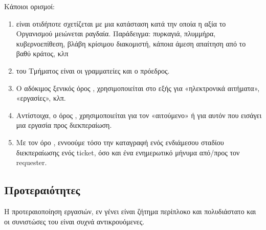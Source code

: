 \documentclass[letterpaper,10pt,greek]{sphinxhowto}
\begin{document}
\sphinxAtStartPar
Κάποιοι ορισμοί:
\begin{enumerate}
%
\item {} 
\sphinxAtStartPar
{} είναι οτιδήποτε σχετίζεται με μια κατάσταση κατά την οποία η αξία το Οργανισμού μειώνεται ραγδαία. Παράδειγμα: πυρκαγιά, πλυμμήρα, κυβερνοεπίθεση, βλάβη κρίσιμου διακομιστή, κάποια άμεση απαίτηση από το βαθύ κράτος, κλπ

\item {} 
\sphinxAtStartPar
{} του Τμήματος είναι οι γραμματείες και ο πρόεδρος.

\item {} 
\sphinxAtStartPar
Ο αδόκιμος ξενικός όρος , χρησιμοποιείται στο εξής για «ηλεκτρονικά αιτήματα», «εργασίες», κλπ.

\item {} 
\sphinxAtStartPar
Αντίστοιχα, ο όρος , χρησιμοποιείται για τον «αιτούμενο» ή για αυτόν που εισάγει μια εργασία προς διεκπεραίωση.

\item {} 
\sphinxAtStartPar
Με τον όρο , εννοούμε τόσο την καταγραφή ενός ενδιάμεσου σταδίου διεκπεραίωσης ενός ticket, όσο και ένα ενημερωτικό μήνυμα από/προς τον requester.

\end{enumerate}


\subsection{Προτεραιότητες}
\label{\detokenize{PolicyTicket:id2}}
\sphinxAtStartPar
Η προτεραιοποίηση εργασιών, εν γένει είναι ζήτημα περίπλοκο και πολυδιάστατο
και οι συνιστώσες του είναι συχνά αντικρουόμενες.
\end{document}
